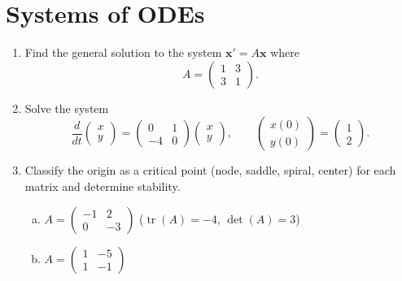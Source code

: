 \documentclass[11pt]{article}
\theoremstyle{definition}
\DeclareMathOperator{\Tr}{tr}
\begin{document}
\section*{Systems of ODEs}

\begin{enumerate}[resume]
\item Find the general solution to the system $\mathbf{x}' = A\mathbf{x}$ where
\[
  A = \begin{pmatrix} 1 & 3 \\ 3 & 1 \end{pmatrix}.
\]

\item Solve the system
\[
  \frac{d}{dt} \begin{pmatrix} x \\ y \end{pmatrix}
  = \begin{pmatrix} 0 & 1 \\ -4 & 0 \end{pmatrix}
    \begin{pmatrix} x \\ y \end{pmatrix}, \qquad
  \begin{pmatrix} x(0) \\ y(0) \end{pmatrix} = \begin{pmatrix} 1 \\ 2 \end{pmatrix}.
\]

\item Classify the origin as a critical point (node, saddle, spiral, center) for each matrix and determine stability.
\begin{enumerate}[(a)]
  \item $A = \begin{pmatrix} -1 & 2 \\ 0 & -3 \end{pmatrix}$ \quad ($\Tr(A) = -4$, $\det(A) = 3$)

  \item $A = \begin{pmatrix} 1 & -5 \\ 1 & -1 \end{pmatrix}$
\end{enumerate}
\end{enumerate}
\end{document}
